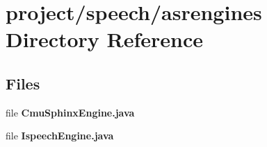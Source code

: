 \section{project/speech/asrengines Directory Reference}
\label{dir_762fe6b473ce3abfc35c75084fccea2c}
\subsection*{Files}
\begin{DoxyCompactItemize}
\item 
file {\bf Cmu\+Sphinx\+Engine.\+java}
\item 
file {\bf Ispeech\+Engine.\+java}
\end{DoxyCompactItemize}
